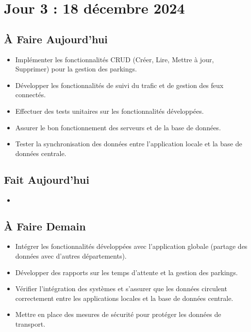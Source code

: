 \documentclass[a4paper,12pt]{report}
\begin{document}
\section{Jour 3 : 18 décembre 2024}

\subsection{À Faire Aujourd'hui}
\begin{itemize}
    \item Implémenter les fonctionnalités CRUD (Créer, Lire, Mettre à jour, Supprimer) pour la gestion des parkings.
    \item Développer les fonctionnalités de suivi du trafic et de gestion des feux connectés.
    \item Effectuer des tests unitaires sur les fonctionnalités développées.
    \item Assurer le bon fonctionnement des serveurs et de la base de données.
    \item Tester la synchronisation des données entre l'application locale et la base de données centrale.
\end{itemize}

\subsection{Fait Aujourd'hui}
\begin{itemize}
    \item
\end{itemize}

\subsection{À Faire Demain}
\begin{itemize}
    \item Intégrer les fonctionnalités développées avec l'application globale (partage des données avec d'autres départements).
    \item Développer des rapports sur les temps d'attente et la gestion des parkings.
    \item Vérifier l'intégration des systèmes et s'assurer que les données circulent correctement entre les applications locales et la base de données centrale.
    \item Mettre en place des mesures de sécurité pour protéger les données de transport.
\end{itemize}
\end{document}
